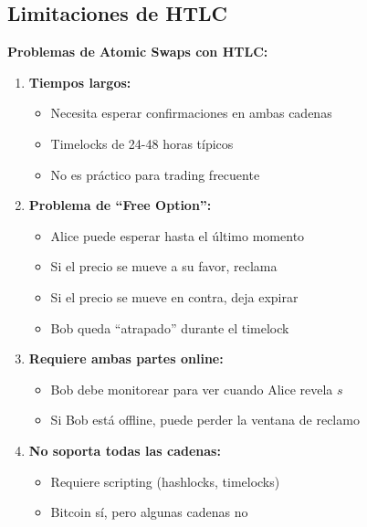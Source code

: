 \documentclass[11pt,a4paper,twoside]{book}
\begin{document}
\subsection{Limitaciones de HTLC}

\begin{remark}
\textbf{Problemas de Atomic Swaps con HTLC:}

\begin{enumerate}
    \item \textbf{Tiempos largos:}
    \begin{itemize}
        \item Necesita esperar confirmaciones en ambas cadenas
        \item Timelocks de 24-48 horas t\'ipicos
        \item No es pr\'actico para trading frecuente
    \end{itemize}
    
    \item \textbf{Problema de ``Free Option'':}
    \begin{itemize}
        \item Alice puede esperar hasta el \'ultimo momento
        \item Si el precio se mueve a su favor, reclama
        \item Si el precio se mueve en contra, deja expirar
        \item Bob queda ``atrapado'' durante el timelock
    \end{itemize}
    
    \item \textbf{Requiere ambas partes online:}
    \begin{itemize}
        \item Bob debe monitorear para ver cuando Alice revela $s$
        \item Si Bob est\'a offline, puede perder la ventana de reclamo
    \end{itemize}
    
    \item \textbf{No soporta todas las cadenas:}
    \begin{itemize}
        \item Requiere scripting (hashlocks, timelocks)
        \item Bitcoin s\'i, pero algunas cadenas no
    \end{itemize}
\end{enumerate}
\end{remark}
\end{document}
